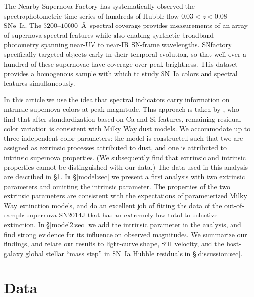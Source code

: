 \documentclass{aastex61}   	%
\begin{document}
The Nearby Supernova Factory \citep[SNfactory;][]{2002SPIE.4836...61A} has systematically observed the
spectrophotometric time series of hundreds of Hubble-flow $0.03<z<0.08$ SNe~Ia.   The $3200$--$10000$~\AA\ spectral coverage
provides measurements of an array of supernova spectral features while also enablng synthetic broadband photometry
spanning near-UV to near-IR SN-frame wavelengths.  SNfactory specifically targeted objects
early in their temporal evolution, so that well over a hundred of these supernovae have  coverage over
peak brightness.  This dataset provides a homogenous sample with which to study SN~Ia colors and spectral features simultaneously.

In this article we use the idea that spectral indicators carry information on intrinsic supernova colors at peak magnitude.
This approach is taken by \citet{2011A&A...529L...4C}, who find that after standardization based on Ca and Si features, remaining residual color
variation is consistent with Milky Way dust models.
We accommodate up to  three independent color parameters: the model is constructed such that 
two are assigned as extrinsic processes attributed to dust, and one is attributed to intrinsic supernova
properties.  (We subsequently find that extrinsic and intrinsic properties cannot be distinguished with our data.)
The data used in this analysis are described in \S\ref{data:sec}.
In \S\ref{model:sec} we present a
first analysis with two extrinsic parameters and omitting the intrinsic parameter.  The properties of the two extrinsic parameters
are consistent with the expectations of parameterized Milky Way extinction models, and do an excellent job of fitting the data of the out-of-sample
supernova SN2014J that has an extremely low total-to-selective extinction.
In \S\ref{model2:sec} we add the intrinsic parameter in the analysis, and find strong evidence for its influence on observed magnitudes.
We summarize our findings, and relate our results to light-curve shape, SiII velocity, and the host-galaxy global stellar ``mass step'' in SN~Ia Hubble
residuals in \S\ref{discussion:sec}.


\section{Data}
\label{data:sec}
\end{document}
